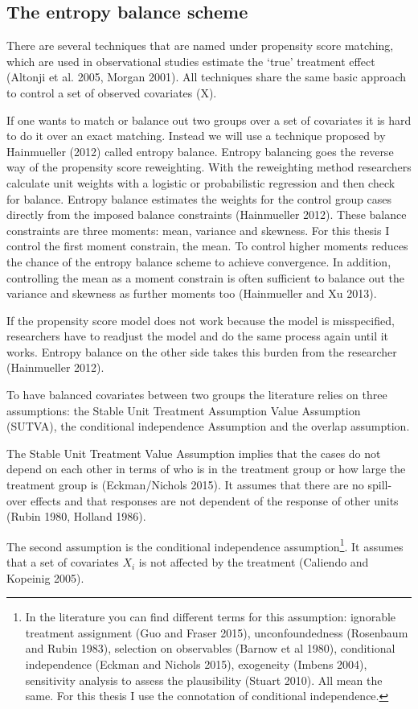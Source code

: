 \subsection{The entropy balance scheme}

There are several techniques that are named under propensity score matching, which are used in observational studies estimate the `true' treatment effect (Altonji et al. 2005, Morgan 2001). All techniques share the same basic approach to control a set of observed covariates (X). 

If one wants to match or balance out two groups over a set of covariates it is hard to do it over an exact matching. Instead we will use a technique proposed by Hainmueller (2012) called entropy balance. Entropy balancing goes the reverse way of the propensity score reweighting. With the reweighting method researchers calculate unit weights with a logistic or probabilistic regression and then check for balance. Entropy balance estimates the weights for the control group cases directly from the imposed balance constraints (Hainmueller 2012). These balance constraints are three moments: mean, variance and skewness. For this thesis I control the first moment constrain, the mean. To control higher moments reduces the chance of the entropy balance scheme to achieve convergence. In addition, controlling the mean as a moment constrain is often sufficient to balance out the variance and skewness as further moments too (Hainmueller and Xu 2013).   

If the propensity score model does not work because the model is misspecified, researchers have to readjust the model and do the same process again until it works. Entropy balance on the other side takes this burden from the researcher (Hainmueller 2012). 

To have balanced covariates between two groups the literature relies on three assumptions: the Stable Unit Treatment Assumption Value Assumption (SUTVA), the conditional independence Assumption and the overlap assumption. 

The Stable Unit Treatment Value Assumption implies that the cases do not depend on each other in terms of who is in the treatment group or how large the treatment group is (Eckman/Nichols 2015). It assumes that there are no spill-over effects and that responses are not dependent of the response of other units (Rubin 1980, Holland 1986). 

The second assumption is the conditional independence assumption\footnote{In the literature you can find different terms for this assumption: ignorable treatment assignment (Guo and Fraser 2015), unconfoundedness (Rosenbaum and Rubin 1983), selection on observables (Barnow et al 1980), conditional independence (Eckman and Nichols 2015), exogeneity (Imbens 2004), sensitivity analysis to assess the plausibility (Stuart 2010). All mean the same. For this thesis I use the connotation of conditional independence.}. It assumes that a set of covariates \(X_{i}\) is not affected by the treatment (Caliendo and Kopeinig 2005).

